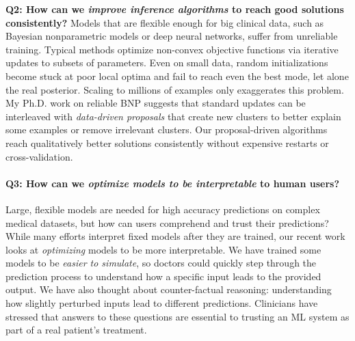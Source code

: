 \documentclass[11pt,letterpaper]{article}
\begin{document}


\textbf{Q2: How can we \emph{improve inference algorithms} to reach good solutions consistently?} 
Models that are flexible enough for big clinical data, such as Bayesian nonparametric models or deep neural networks,
suffer from unreliable training.
Typical methods optimize non-convex objective functions via iterative updates to subsets of parameters. Even on small data, random initializations become stuck at poor local optima and fail to reach even the best mode, let alone the real posterior. Scaling to millions of examples only exaggerates this problem.
My Ph.D. work on reliable BNP suggests that standard updates can be interleaved with \emph{data-driven proposals} that create new clusters to better explain some examples or remove irrelevant clusters.
Our proposal-driven algorithms reach qualitatively better solutions consistently without expensive restarts or cross-validation.

\paragraph{{Q3: How can we \emph{optimize models to be interpretable} to human users?}}
Large, flexible models are needed for high accuracy predictions on complex medical datasets, but how can users comprehend and trust their predictions?
While many efforts interpret fixed models after they are trained, our recent work looks at \emph{optimizing} models to be more interpretable. 
We have trained some models to be \emph{easier to simulate}, so doctors could quickly step through the prediction process to understand how a specific input leads to the provided output.
We have also thought about counter-factual reasoning: understanding how slightly perturbed inputs lead to different predictions. Clinicians have stressed that answers to these questions are essential to trusting an ML system as part of a real patient's treatment.
\end{document}
